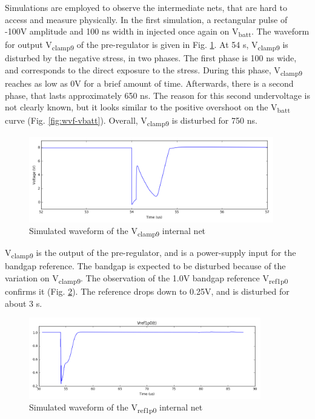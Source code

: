 Simulations are employed to observe the intermediate nets, that are hard to access and measure physically.
In the first simulation, a rectangular pulse of -100V amplitude and 100 ns width in injected once again on V\textsubscript{batt}.
The waveform for output V\textsubscript{clamp9} of the pre-regulator is given in Fig. \ref{fig:wvf-vclamp9}.
At 54 \textmugreek{}s,  V\textsubscript{clamp9} is disturbed by the negative stress, in two phases.
The first phase is 100 ns wide, and corresponds to the direct exposure to the stress.
During this phase, V\textsubscript{clamp9} reaches as low as 0V for a brief amount of time.
Afterwards, there is a second phase, that lasts approximately 650 ns.
The reason for this second undervoltage is not clearly known, but it looks similar to the positive overshoot on the  V\textsubscript{batt} curve (Fig. \ref{fig:wvf-vbatt}).
Overall, V\textsubscript{clamp9} is disturbed for 750 ns.

\begin{figure}[!h]
  \centering
  \includegraphics[width=0.95\textwidth]{src/3/figures/vclamp9.png}
  \caption{Simulated waveform of the V\textsubscript{clamp9} internal net}
  \label{fig:wvf-vclamp9}
\end{figure}

V\textsubscript{clamp9} is the output of the pre-regulator, and is a power-supply input for the bandgap reference.
The bandgap is expected to be disturbed because of the variation on V\textsubscript{clamp9}.
The observation of the 1.0V bandgap reference V\textsubscript{ref1p0} confirms it (Fig. \ref{fig:wvf-v1p0}).
The reference drops down to 0.25V, and is disturbed for about 3 \textmugreek{}s.

\begin{figure}[!h]
  \centering
  \includegraphics[width=0.9\textwidth]{src/3/figures/v1p0.png}
  \caption{Simulated waveform of the V\textsubscript{ref1p0} internal net}
  \label{fig:wvf-v1p0}
\end{figure}

